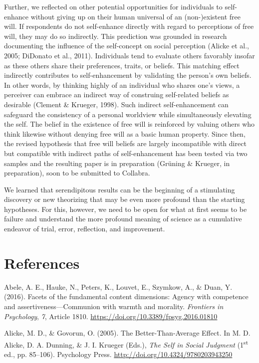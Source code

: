\documentclass[authordate, anecdote]{jote-new-article}
\begin{document}
	Further, we reflected on other potential opportunities for individuals to self-enhance without giving up on their human universal of an (non-)existent free will. If respondents do not self-enhance directly with regard to perceptions of free will, they may do so indirectly. This prediction was grounded in research documenting the influence of the self-concept on social perception (Alicke et al., 2005; DiDonato et al., 2011). Individuals tend to evaluate others favorably insofar as these others share their preferences, traits, or beliefs. This matching effect indirectly contributes to self-enhancement by validating the person's own beliefs. In other words, by thinking highly of an individual who shares one's views, a perceiver can embrace an indirect way of construing self-related beliefs as desirable (Clement \& Krueger, 1998). Such indirect self-enhancement can safeguard the consistency of a personal worldview while simultaneously elevating the self. The belief in the existence of free will is reinforced by valuing others who think likewise without denying free will as a basic human property. Since then, the revised hypothesis that free will beliefs are largely incompatible with direct but compatible with indirect paths of self-enhancement has been tested via two samples and the resulting paper is in preparation (Grüning \& Krueger, in preparation), soon to be submitted to Collabra.



	We learned that serendipitous results can be the beginning of a stimulating discovery or new theorizing that may be even more profound than the starting hypotheses. For this, however, we need to be open for what at first seems to be failure and understand the more profound meaning of science as a cumulative endeavor of trial, error, reflection, and improvement.



	\section{References}



	Abele, A. E., Hauke, N., Peters, K., Louvet, E., Szymkow, A., \& Duan, Y. (2016). Facets of the fundamental content dimensions: Agency with competence and assertiveness—Communion with warmth and morality. \emph{Frontiers in Psychology}, \emph{7}, Article 1810. \url{https://doi.org/10.3389/fpsyg.2016.01810}



	Alicke, M. D., \& Govorun, O. (2005). The Better-Than-Average Effect. In M. D. Alicke, D. A. Dunning, \& J. I. Krueger (Eds.), \emph{The Self in Social Judgment} (1\textsuperscript{st} ed., pp. 85--106). Psychology Press. \url{http://doi.org/10.4324/9780203943250}
\end{document}
